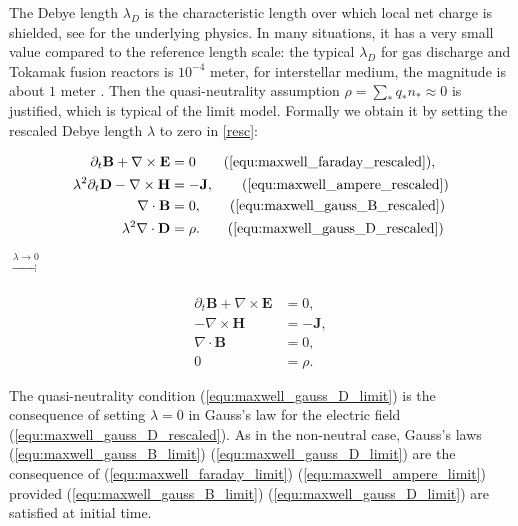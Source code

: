 \documentclass{article}
\begin{document}
The Debye length $\lambda_D$ is the characteristic length over which local net charge is
shielded, see \cite[Sec. 1.4]{chen2016} for the underlying physics. In many situations, it
has a very small value compared to the reference length scale: the typical $\lambda_D$ for
gas discharge and Tokamak fusion reactors is $10^{-4}$ meter, for interstellar medium, the
magnitude is about $1$ meter \cite[Ch. 20]{Blandford_2013}. Then the quasi-neutrality
assumption $\rho = \sum_* q_*n_* \approx 0$ is justified, which is typical of the limit
model.  Formally we obtain it by setting the rescaled Debye length $\lambda$ to zero in
\eqref{resc}:
\begin{center}
    \begin{minipage}{0.3\textwidth}
    \begin{align*}
        \partial_t \mathbf{B} + \nabla \times \mathbf{E} &= 0 \tag{\ref{equ:maxwell_faraday_rescaled}},\\ 
        \lambda^2 \partial_t \mathbf{D} - \nabla \times \mathbf{H} &= - \mathbf{J}, \tag{\ref{equ:maxwell_ampere_rescaled}}\\
        \nabla \cdot \mathbf{B} &= 0, \tag{\ref{equ:maxwell_gauss_B_rescaled}}\\
        \lambda^2 \nabla \cdot \mathbf{D} &= \rho. \tag{\ref{equ:maxwell_gauss_D_rescaled}}
    \end{align*}
\end{minipage}
\hspace{0.6cm}$\xrightarrow[]{\lambda \rightarrow 0}$
\begin{minipage}{0.3\textwidth}
  \begin{subequations}
    \label{limit}
\begin{align}
    \partial_t \mathbf{B} + \nabla \times \mathbf{E} &= 0, \label{equ:maxwell_faraday_limit} \\ 
    - \nabla \times \mathbf{H} &= - \mathbf{J}, \label{equ:maxwell_ampere_limit} \\
    \nabla \cdot \mathbf{B} &= 0,  \label{equ:maxwell_gauss_B_limit}\\
     0 &= \rho. \label{equ:maxwell_gauss_D_limit}
\end{align}
\end{subequations}
\end{minipage}
\end{center}
The quasi-neutrality condition (\ref{equ:maxwell_gauss_D_limit}) is the consequence of
setting $\lambda = 0$ in Gauss's law for the electric field
(\ref{equ:maxwell_gauss_D_rescaled}). As in the non-neutral case, Gauss's laws
(\ref{equ:maxwell_gauss_B_limit}) (\ref{equ:maxwell_gauss_D_limit}) are the consequence of
(\ref{equ:maxwell_faraday_limit}) (\ref{equ:maxwell_ampere_limit}) provided
(\ref{equ:maxwell_gauss_B_limit}) (\ref{equ:maxwell_gauss_D_limit}) are satisfied at
initial time.
\end{document}
